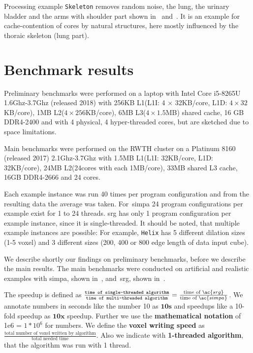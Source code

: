 \documentclass{article}
\begin{document}
Processing example \texttt{Skeleton} removes random noise, the lung, the urinary bladder and the arms with shoulder part shown in~ and~.
It is an example for cache-contention of cores by natural structures, here mostly influenced by the thoraic skeleton (lung part).

\section{Benchmark results}\label{sec:benchmark}
Preliminary benchmarks were performed on a laptop with Intel Core i5-8265U 1.6Ghz-3.7Ghz (released 2018) with 256KB L1(L1I: 4 $\times$ 32KB/core, L1D: $4\times 32$KB/core), 1MB L2($4 \times 256$KB/core), 6MB L3($4 \times 1.5$MB) shared cache, 16 GB DDR4-2400 and with 4 physical, 4 hyper-threaded cores, but are sketched due to space limitations.\par
Main benchmarks were performed on the RWTH cluster on a Platinum 8160 (released 2017) 2.1Ghz-3.7Ghz with 1.5MB L1(L1I: 32KB/core, L1D: 32KB/core), 24MB L2(24cores with each 1MB/core), 33MB shared L3 cache, 16GB DDR4-2666 and 24 cores.\par
Each example instance was run 40 times per program configuration and from the resulting data the average was taken.
For~\ac{simpa} 24 program configurations per example exist for 1 to 24 threads.
\Ac{srg} has only 1 program configuration per example instance, since it is single-threaded.
It should be noted, that multiple example instances are possible:
For example, \texttt{Helix} has 5 different dilation sizes (1-5 voxel) and 3 different sizes (200, 400 or 800 edge length of data input cube).\par
We describe shortly our findings on preliminary benchmarks, before we describe the main results. 
The main benchmarks were conducted on artificial and realistic examples with \ac{simpa}, shown in~, and~\ac{srg}, shown in~.\par
The speedup is defined as $\frac{\texttt{time of single-threaded algorithm}}{\texttt{time of multi-threaded algorithm}} = \frac{\text{time of }\ac{srg}}{\text{time of }\ac{simpa}}$. 
We annotate numbers in seconds like the number 10 as $\mathbf{10s}$ and speedups like a 10-fold speedup as $\mathbf{10x}$ speedup. 
Further we use the \textbf{mathematical notation} of 1e6 = $1*10^6$ for numbers.
We define the \textbf{voxel writing speed} as $\frac{\text{total number of voxel written by algorithm}}{\text{total needed time}}$.
Also we indicate with \textbf{1-threaded algorithm}, that the algorithm was run with 1 thread.
\end{document}
